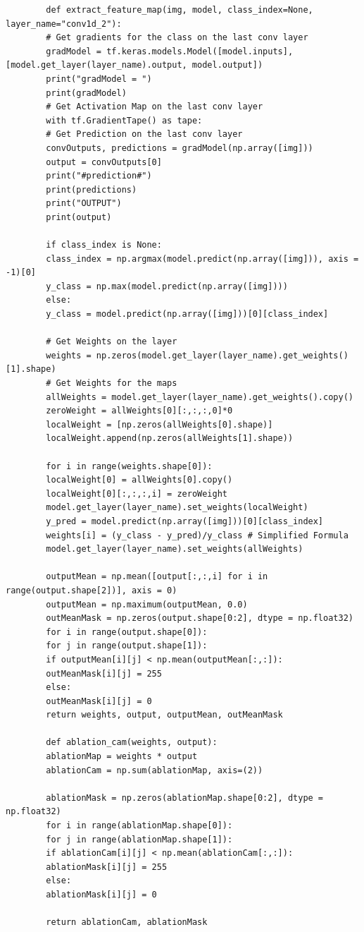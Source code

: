 \documentclass[conference]{IEEEtran}
\begin{document}
	\begin{lstlisting}
		def extract_feature_map(img, model, class_index=None, layer_name="conv1d_2"):
		# Get gradients for the class on the last conv layer
		gradModel = tf.keras.models.Model([model.inputs],[model.get_layer(layer_name).output, model.output])
		print("gradModel = ")
		print(gradModel)
		# Get Activation Map on the last conv layer
		with tf.GradientTape() as tape:
		# Get Prediction on the last conv layer
		convOutputs, predictions = gradModel(np.array([img]))
		output = convOutputs[0]
		print("#prediction#")
		print(predictions)
		print("OUTPUT")
		print(output)
		
		if class_index is None:
		class_index = np.argmax(model.predict(np.array([img])), axis = -1)[0]
		y_class = np.max(model.predict(np.array([img])))
		else:
		y_class = model.predict(np.array([img]))[0][class_index]
		
		# Get Weights on the layer
		weights = np.zeros(model.get_layer(layer_name).get_weights()[1].shape)
		# Get Weights for the maps
		allWeights = model.get_layer(layer_name).get_weights().copy()
		zeroWeight = allWeights[0][:,:,:,0]*0
		localWeight = [np.zeros(allWeights[0].shape)]
		localWeight.append(np.zeros(allWeights[1].shape))
		
		for i in range(weights.shape[0]):
		localWeight[0] = allWeights[0].copy()
		localWeight[0][:,:,:,i] = zeroWeight
		model.get_layer(layer_name).set_weights(localWeight)
		y_pred = model.predict(np.array([img]))[0][class_index]
		weights[i] = (y_class - y_pred)/y_class # Simplified Formula
		model.get_layer(layer_name).set_weights(allWeights)
		
		outputMean = np.mean([output[:,:,i] for i in range(output.shape[2])], axis = 0)
		outputMean = np.maximum(outputMean, 0.0)
		outMeanMask = np.zeros(output.shape[0:2], dtype = np.float32)
		for i in range(output.shape[0]):
		for j in range(output.shape[1]):
		if outputMean[i][j] < np.mean(outputMean[:,:]):
		outMeanMask[i][j] = 255
		else:
		outMeanMask[i][j] = 0
		return weights, output, outputMean, outMeanMask
		
		def ablation_cam(weights, output):
		ablationMap = weights * output
		ablationCam = np.sum(ablationMap, axis=(2))
		
		ablationMask = np.zeros(ablationMap.shape[0:2], dtype = np.float32)
		for i in range(ablationMap.shape[0]):
		for j in range(ablationMap.shape[1]):
		if ablationCam[i][j] < np.mean(ablationCam[:,:]):
		ablationMask[i][j] = 255
		else:
		ablationMask[i][j] = 0
		
		return ablationCam, ablationMask
	\end{lstlisting}
	
\end{document}

